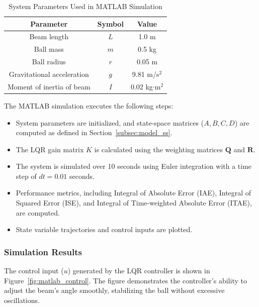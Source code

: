 \documentclass[conference]{IEEEtran}
\begin{document}
\begin{table}[H]
\caption[]{System Parameters Used in MATLAB Simulation}
\label{tab:system_params}
\centering
\begin{tabular}{|c|c|c|}
\hline
\textbf{Parameter} & \textbf{Symbol} & \textbf{Value} \\ \hline
Beam length & \(L\) & 1.0 m \\ \hline
Ball mass & \(m\) & 0.5 kg \\ \hline
Ball radius & \(r\) & 0.05 m \\ \hline
Gravitational acceleration & \(g\) & 9.81 m/s\(^2\) \\ \hline
Moment of inertia of beam & \(I\) & 0.02 kg$\cdot$m\(^2\) \\ \hline
\end{tabular}
\end{table}

The MATLAB simulation executes the following steps:
\begin{itemize}
    \item System parameters are initialized, and state-space matrices (\(A, B, C, D\)) are computed as defined in Section~\ref{subsec:model_ss}.
    \item The LQR gain matrix \(K\) is calculated using the weighting matrices \(\mathbf{Q}\) and \(\mathbf{R}\).
    \item The system is simulated over 10 seconds using Euler integration with a time step of \(dt = 0.01\) seconds.
    \item Performance metrics, including Integral of Absolute Error (IAE), Integral of Squared Error (ISE), and Integral of Time-weighted Absolute Error (ITAE), are computed.
    \item State variable trajectories and control inputs are plotted.
\end{itemize}

\subsubsection{Simulation Results}
The control input (\(u\)) generated by the LQR controller is shown in Figure~\ref{fig:matlab_control}. The figure demonstrates the controller's ability to adjust the beam's angle smoothly, stabilizing the ball without excessive oscillations.
\end{document}
